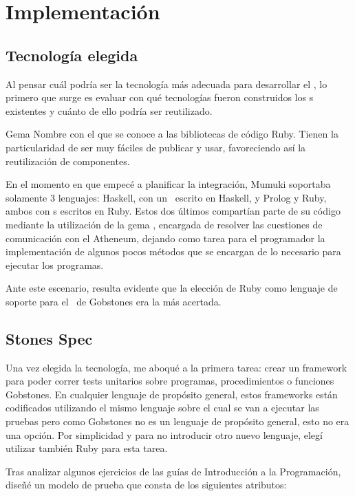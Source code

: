 
\section{Implementación}

\subsection{Tecnología elegida}
Al pensar cuál podría ser la tecnología más adecuada para desarrollar el \runner, lo primero que surge es evaluar con qué tecnologías fueron construidos los \runner s existentes y cuánto de ello podría ser reutilizado.

\sepfootnotecontent
  {Gema}
  {Nombre con el que se conoce a las bibliotecas de código Ruby. Tienen la particularidad de ser muy fáciles de publicar y usar, favoreciendo así la reutilización de componentes.}

En el momento en que empecé a planificar la integración, Mumuki soportaba solamente 3 lenguajes: Haskell, con un \runner\ escrito en Haskell, y Prolog y Ruby, ambos con \runner s escritos en Ruby. Estos dos últimos compartían parte de su código mediante la utilización de la gema \mumukit, encargada de resolver las cuestiones de comunicación con el Atheneum, dejando como tarea para el programador la implementación de algunos pocos métodos que se encargan de lo necesario para ejecutar los programas.

Ante este escenario, resulta evidente que la elección de Ruby como lenguaje de soporte para el \runner\ de Gobstones era la más acertada.

\subsection{Stones Spec}
Una vez elegida la tecnología, me aboqué a la primera tarea: crear un framework para poder correr tests unitarios sobre programas, procedimientos o funciones Gobstones. En cualquier lenguaje de propósito general, estos frameworks están codificados utilizando el mismo lenguaje sobre el cual se van a ejecutar las pruebas pero como Gobstones no es un lenguaje de propósito general, esto no era una opción. Por simplicidad y para no introducir otro nuevo lenguaje, elegí utilizar también Ruby para esta tarea.

Tras analizar algunos ejercicios de las guías de Introducción a la Programación, diseñé un modelo de prueba que consta de los siguientes atributos:

